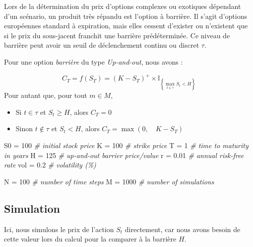 \documentclass[
]{article}
\newenvironment{Shaded}{\begin{snugshade}}{\end{snugshade}}
\newcommand{\CommentTok}[1]{\textcolor[rgb]{0.56,0.35,0.01}{\textit{#1}}}
\newcommand{\DecValTok}[1]{\textcolor[rgb]{0.00,0.00,0.81}{#1}}
\newcommand{\FloatTok}[1]{\textcolor[rgb]{0.00,0.00,0.81}{#1}}
\newcommand{\NormalTok}[1]{#1}
\newcommand{\OtherTok}[1]{\textcolor[rgb]{0.56,0.35,0.01}{#1}}
\providecommand{\tightlist}{%
  \setlength{\itemsep}{0pt}\setlength{\parskip}{0pt}}
\begin{document}
Lors de la détermination du prix d'options complexes ou exotiques
dépendant d'un scénario, un produit très répandu est l'option à
barrière. Il s'agit d'options européennes standard à expiration, mais
elles cessent d'exister ou n'existent que si le prix du sous-jacent
franchit une barrière prédéterminée. Ce niveau de barrière peut avoir un
seuil de déclenchement continu ou discret \(\tau\).

Pour une option \emph{barrière} du type \emph{Up-and-out}, nous avons :

\[
C_{T}=f(S_{T})=(K-S_{T})^{+}\times\mathbb{I}_{\left\{ \max\limits _{t\in\tau}S_{t}<H\right\} }
\] Pour autant que, pour tout \(m\in M\),

\begin{itemize}
\tightlist
\item
  Si \(t\in\tau\) et \(S_t\geq H\), alors \(C_T = 0\)
\item
  Sinon \(t\notin\tau\) et \(S_t < H\), alors
  \(C_T = \max (0,\quad K-S_T)\)
\end{itemize}

\begin{Shaded}
\begin{Highlighting}[]
\NormalTok{S0 }\OtherTok{=} \DecValTok{100}      \CommentTok{\# initial stock price}
\NormalTok{K }\OtherTok{=} \DecValTok{100}       \CommentTok{\# strike price}
\NormalTok{T }\OtherTok{=} \DecValTok{1}         \CommentTok{\# time to maturity in years}
\NormalTok{H }\OtherTok{=} \DecValTok{125}       \CommentTok{\# up{-}and{-}out barrier price/value}
\NormalTok{r }\OtherTok{=} \FloatTok{0.01}      \CommentTok{\# annual risk{-}free rate}
\NormalTok{vol }\OtherTok{=} \FloatTok{0.2}     \CommentTok{\# volatility (\%)}

\NormalTok{N }\OtherTok{=} \DecValTok{100}       \CommentTok{\# number of time steps}
\NormalTok{M }\OtherTok{=} \DecValTok{1000}      \CommentTok{\# number of simulations}
\end{Highlighting}
\end{Shaded}

\hypertarget{simulation}{%
\subsection{Simulation}\label{simulation}}

Ici, nous simulons le prix de l'action \(S_t\) directement, car nous
avons besoin de cette valeur lors du calcul pour la comparer à la
barrière \(H\).
\end{document}
